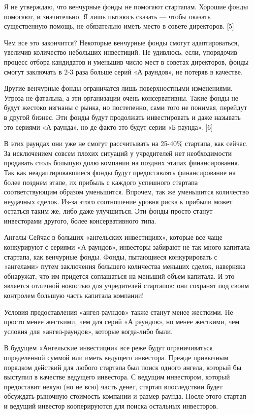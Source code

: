 \documentclass[ebook,12pt,oneside,openany]{memoir}
\begin{document}
Я не утверждаю, что венчурные фонды не помогают стартапам. Хорошие
фонды помогают, и значительно. Я лишь пытаюсь сказать — чтобы оказать
существенную помощь, не обязательно иметь место в совете директоров.
[5]

Чем все это закончится? Некоторые венчурные фонды смогут
адаптироваться, увеличив количество небольших инвестиций. Не удивлюсь,
если, упорядочив процесс отбора кандидатов и уменьшив число мест в
советах директоров, фонды смогут заключать в 2-3 раза больше серий «А
раундов», не потеряв в качестве.

Другие венчурные фонды ограничатся лишь поверхностными изменениями.
Угроза не фатальна, а эти организации очень консервативны. Такие фонды
не будут жестоко изгнаны с рынка, но постепенно, сами того не понимая,
перейдут в другой бизнес. Эти фонды будут продолжать инвестировать и
даже называть это сериями «А раунда», но де факто это будут серии «Б
раунда». [6]

В этих раундах они уже не смогут рассчитывать на 25-40\% стартапа, как
сейчас. За исключением совсем плохих ситуаций у учредителей нет
необходимости продавать столь большую долю компании на поздних этапах
финансирования. Так как неадаптировавшиеся фонды будут предоставлять
финансирование на более позднем этапе, их прибыль с каждого успешного
стартапа соответствующим образом уменьшится. Впрочем, так же
уменьшится количество неудачных сделок. Из-за этого соотношение уровня
риска к прибыли может остаться таким же, либо даже улучшиться. Эти
фонды просто станут инвесторами другого, более консервативного типа.

Ангелы Сейчас в больших «ангельских инвестициях», которые все чаще
конкурируют с сериями «А раундов», инвесторы забирают не так много
капитала стартапа, как венчурные фонды. Фонды, пытающиеся
конкурировать с «ангелами» путем заключения большего количества
меньших сделок, наверняка обнаружат, что им придется соглашаться на
меньший объем капитала. И это является отличной новостью для
учредителей стартапов: они сохранят под своим контролем большую часть
капитала компании!

Условия предоставления «ангел-раундов» также станут менее жесткими. Не
просто менее жесткими, чем для серий «А раундов», но менее жесткими,
чем условия для «ангел-раундов», которые когда-либо были.

В будущем «Ангельские инвестиции» все реже будут ограничиваться
определенной суммой или иметь ведущего инвестора. Прежде привычным
порядком действий для любого стартапа был поиск одного ангела, который
бы выступил в качестве ведущего инвестора. С ведущим инвестором,
который предоставит некую (но не всю) часть денег, стартап
впоследствии будет обсуждать рыночную стоимость компании и размер
раунда. После этого стартап и ведущий инвестор кооперируются для
поиска остальных инвесторов.
\end{document}

